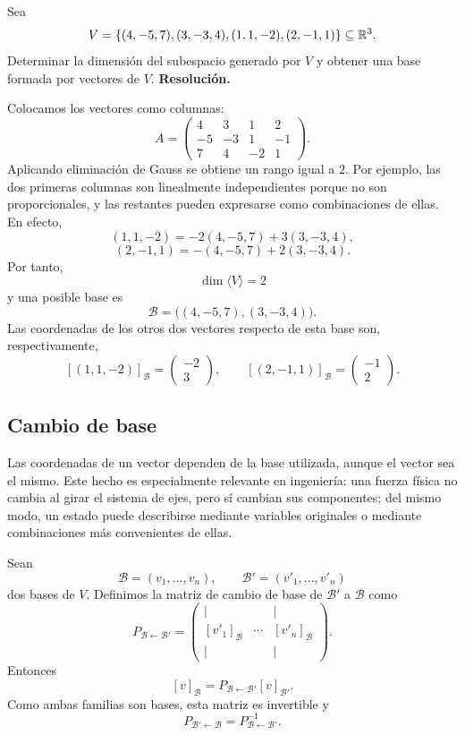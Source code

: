 \begin{solvedexercise}
Sea
\[
V=\{(4,-5,7),(3,-3,4),(1,1,-2),(2,-1,1)\}\subseteq\mathbb{R}^3.
\]
Determinar la dimensión del subespacio generado por $V$ y obtener una base formada por vectores de $V$.
\tcblower
\textbf{Resolución.}\par\smallskip
Colocamos los vectores como columnas:
\[
A=
\begin{pmatrix}
4&3&1&2\\
-5&-3&1&-1\\
7&4&-2&1
\end{pmatrix}.
\]
Aplicando eliminación de Gauss se obtiene un rango igual a $2$. Por ejemplo, las dos primeras columnas son linealmente independientes porque no son proporcionales, y las restantes pueden expresarse como combinaciones de ellas. En efecto,
\[
(1,1,-2)=-2(4,-5,7)+3(3,-3,4),
\]
\[
(2,-1,1)=-(4,-5,7)+2(3,-3,4).
\]
Por tanto,
\[
\boxed{\dim\langle V\rangle=2}
\]
y una posible base es
\[
\boxed{\mathcal B=\bigl((4,-5,7),(3,-3,4)\bigr).}
\]
Las coordenadas de los otros dos vectores respecto de esta base son, respectivamente,
\[
[(1,1,-2)]_{\mathcal B}=\begin{pmatrix}-2\\3\end{pmatrix},
\qquad
[(2,-1,1)]_{\mathcal B}=\begin{pmatrix}-1\\2\end{pmatrix}.
\]
\end{solvedexercise}

\subsection{Cambio de base}

Las coordenadas de un vector dependen de la base utilizada, aunque el vector sea el mismo. Este hecho es especialmente relevante en ingeniería: una fuerza física no cambia al girar el sistema de ejes, pero sí cambian sus componentes; del mismo modo, un estado puede describirse mediante variables originales o mediante combinaciones más convenientes de ellas.

Sean
\[
\mathcal B=(v_1,\ldots,v_n),
\qquad
\mathcal B'=(v'_1,\ldots,v'_n)
\]
dos bases de $V$. Definimos la matriz de cambio de base de $\mathcal B'$ a $\mathcal B$ como
\[
P_{\mathcal B\leftarrow\mathcal B'}
=
\begin{pmatrix}
|&&|\\
[v'_1]_{\mathcal B}&\cdots&[v'_n]_{\mathcal B}\\
|&&|
\end{pmatrix}.
\]
Entonces
\[
\boxed{
[v]_{\mathcal B}
=P_{\mathcal B\leftarrow\mathcal B'}[v]_{\mathcal B'}.
}
\]
Como ambas familias son bases, esta matriz es invertible y
\[
P_{\mathcal B'\leftarrow\mathcal B}
=
P_{\mathcal B\leftarrow\mathcal B'}^{-1}.
\]

